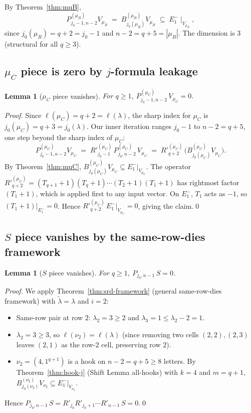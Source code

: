\documentclass[11pt]{article}
\newtheorem{lemma}[theorem]{Lemma}
\theoremstyle{definition}
\begin{document}
By Theorem~\ref{thm:muB},
\[
   P^{(\mu_B)}_{j_0 - 1, n - 2} V_{\mu_B}
   \;=\; B^{(\mu_B)}_{j_0(\mu_B)} V_{\mu_B}
   \;\subseteq\; E_1^-\!\mid_{V_{\mu_B}},
\]
since $j_0(\mu_B) = q + 2 = j_0 - 1$ and $n - 2 = q + 5 = |\mu_B|$.
The dimension is $3$ (structural for all $q \ge 3$).

\subsection{$\mu_C$ piece is zero by $j$-formula leakage}

\begin{lemma}[$\mu_C$ piece vanishes]\label{lem:muC-zero}
For $q \ge 1$, $P^{(\mu_C)}_{j_0-1, n-2}\, V_{\mu_C} = 0$.
\end{lemma}

\begin{proof}
Since $\ell(\mu_C) = q + 2 = \ell(\lambda)$, the sharp index for
$\mu_C$ is $j_0(\mu_C) = q + 3 = j_0(\lambda)$. Our inner iteration
ranges $j_0 - 1$ to $n - 2 = q + 5$, one step beyond the sharp index
of $\mu_C$:
\[
   P^{(\mu_C)}_{j_0-1, n-2} V_{\mu_C}
   \;=\; R'^{(\mu_C)}_{j_0-1}\, P^{(\mu_C)}_{j_0, n-2}\, V_{\mu_C}
   \;=\; R'^{(\mu_C)}_{q+2}\,\big(B^{(\mu_C)}_{j_0(\mu_C)} V_{\mu_C}\big).
\]
By Theorem~\ref{thm:muC}, $B^{(\mu_C)}_{j_0(\mu_C)} V_{\mu_C}
\subseteq E_1^-|_{V_{\mu_C}}$. The operator $R'^{(\mu_C)}_{q+2}
= (T_{q+1}{+}1)(T_q{+}1)\cdots(T_2{+}1)(T_1{+}1)$ has rightmost factor
$(T_1{+}1)$, which is applied first to any input vector. On
$E_1^-$, $T_1$ acts as $-1$, so $(T_1{+}1)|_{E_1^-} = 0$. Hence
$R'^{(\mu_C)}_{q+2}\, E_1^-|_{V_{\mu_C}} = 0$, giving the claim.\qed
\end{proof}

\subsection{$S$ piece vanishes by the same-row-dies framework}

\begin{lemma}[$S$ piece vanishes]\label{lem:S-zero}
For $q \ge 1$, $P_{j_0, n-1}\, S = 0$.
\end{lemma}

\begin{proof}
We apply Theorem~\ref{thm:srd-framework} (general same-row-dies
framework) with $\widetilde\lambda = \lambda$ and $i = 2$:
\begin{itemize}[leftmargin=2em,topsep=0.2em,itemsep=0.1em]
\item Same-row pair at row $2$: $\lambda_2 = 3 \ge 2$ and
$\lambda_3 = 1 \le \lambda_2 - 2 = 1$.~\checkmark
\item $\lambda_2 = 3 \ge 3$, so $\ell(\nu_2) = \ell(\lambda)$ (since
removing two cells $(2, 2), (2, 3)$ leaves $(2, 1)$ as the row-$2$
cell, preserving row $2$).~\checkmark
\item $\nu_2 = (4, 1^{q+1})$ is a hook on $n - 2 = q + 5 \ge 8$
letters. By Theorem~\ref{thm:hook-j} (Shift Lemma all-hooks)
with $k = 4$ and $m = q + 1$,
$B^{(\nu_2)}_{j_0(\nu_2)} V_{\nu_2} \subseteq E_1^-|_{V_{\nu_2}}$.~\checkmark
\end{itemize}
Hence $P_{j_0, n-1}\, S = R'_{j_0} R'_{j_0 + 1} \cdots R'_{n-1}\, S
= 0$.\qed
\end{proof}
\end{document}
